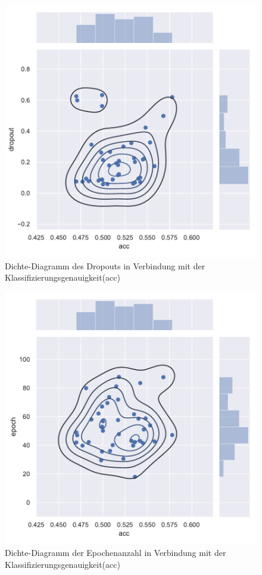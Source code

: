 \begin{figure}[H]
  \centering  
  \includegraphics[scale=0.5]{anhang/GA_250_cifar10_True_big_jointplot_dropout.pdf}
  \caption{Dichte-Diagramm des Dropouts in Verbindung mit der Klassifizierungsgenauigkeit(acc)}
  
\end{figure}

\begin{figure}[H]
  \centering  
  \includegraphics[scale=0.5]{anhang/GA_250_cifar10_True_big_jointplot_epoch.pdf}
  \caption{Dichte-Diagramm der Epochenanzahl in Verbindung mit der Klassifizierungsgenauigkeit(acc)}
  
\end{figure}

